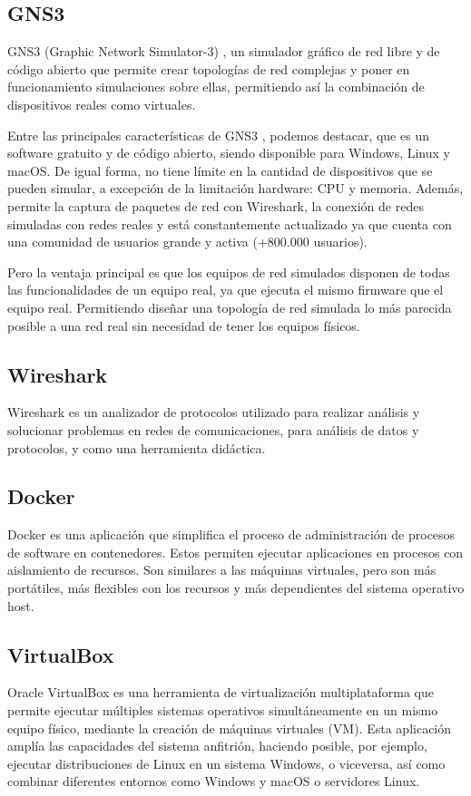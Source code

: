 \subsection{GNS3}
GNS3 (Graphic Network Simulator-3) \cite{gns3_wiki}, un simulador gráfico de red libre y de código
abierto que permite crear topologías de red complejas y poner en funcionamiento simulaciones sobre ellas, 
permitiendo así la combinación de dispositivos reales como virtuales.

\vspace{0.5cm}
Entre las principales características de GNS3 \cite{ccnadesdecero_gns3}, podemos destacar, que es un software gratuito y de código abierto, siendo disponible para Windows, Linux y macOS. De igual forma, no tiene límite en la cantidad de dispositivos que se pueden simular, a excepción de la limitación hardware: CPU y memoria. Además, permite la captura de paquetes de red con Wireshark, la conexión de redes simuladas con redes reales y está constantemente actualizado ya que cuenta con una comunidad de usuarios grande y activa (+800.000 usuarios).

\vspace{0.5cm}
Pero la ventaja principal es que los equipos de red simulados disponen de todas las funcionalidades de un equipo real, ya que ejecuta el mismo firmware que el equipo real. Permitiendo diseñar una topología de red simulada lo más parecida posible a una red real sin necesidad de tener los equipos físicos. 

\subsection{Wireshark}
Wireshark \cite{wikipedia_wireshark} es un analizador de protocolos utilizado para realizar análisis y solucionar problemas en redes de comunicaciones, para análisis de datos y protocolos, y como una herramienta didáctica.

\subsection{Docker}
Docker es \cite{docker_ubuntu_tutorial} una aplicación que simplifica el proceso de administración de procesos de software en contenedores. Estos permiten ejecutar aplicaciones en procesos con aislamiento de recursos. Son similares a las máquinas virtuales, pero son más portátiles, más flexibles con los recursos y más dependientes del sistema operativo host.

\subsection{VirtualBox}
Oracle VirtualBox \cite{virtualbox_introduction} es una herramienta de virtualización multiplataforma que permite ejecutar múltiples sistemas operativos simultáneamente en un mismo equipo físico, mediante la creación de máquinas virtuales (VM). Esta aplicación amplía las capacidades del sistema anfitrión, haciendo posible, por ejemplo, ejecutar distribuciones de Linux en un sistema Windows, o viceversa, así como combinar diferentes entornos como Windows 
y macOS o servidores Linux. 

